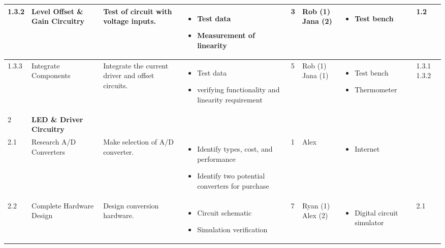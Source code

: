 \begin{table}
\begin{tabular}{|m{1cm}|m{1.5cm}|m{2cm}|m{2cm}|m{1cm}|m{1cm}|m{2.5cm}|m{1cm}|   }
1.3.2 & Level Offset \& Gain Circuitry & Test of circuit with voltage inputs. & 
	\begin{itemize} \item Test data  \item Measurement of linearity \end{itemize}
	& 3 & Rob (1) Jana (2) & 
	\begin{itemize} \item Test bench \end{itemize} & 1.2 \\ \hline

1.3.3 & Integrate Components & Integrate the current driver and offset circuits. & 
	\begin{itemize} \item Test data \item verifying functionality and linearity requirement \end{itemize} 
	&  5 & Rob (1) Jana (1) & 
	\begin{itemize} \item Test bench \item Thermometer \end{itemize} & 1.3.1 1.3.2 \\ \hline

2 & \textbf{LED \& Driver Circuitry} & & & & & & \\ \hline

2.1 & Research A/D Converters & Make selection of A/D converter. &
	\begin{itemize} \item Identify types, cost, and performance \item Identify two potential converters for purchase  \end{itemize}
	& 1 & Alex & \begin{itemize} \item Internet \end{itemize} & \\ \hline

2.2 & Complete Hardware Design  & Design conversion hardware. & 
	\begin{itemize} \item Circuit schematic \item Simulation verification \end{itemize}
	& 7 & Ryan (1) Alex (2) & 
	\begin{itemize} \item Digital circuit simulator \end{itemize} & 2.1 \\ \hline


\end{tabular}
\end{table}
